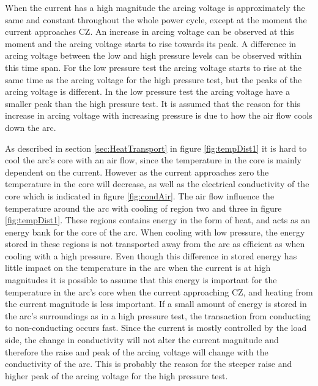 \documentclass[10pt,a4paper]{article}
\begin{document}
When the current has a high magnitude the arcing voltage is approximately the same and constant throughout the whole power cycle, except at the moment the current approaches CZ. An increase in arcing voltage can be observed at this moment and the arcing voltage starts to rise towards its peak. A difference in arcing voltage between the low and high pressure levels can be observed within this time span. For the low pressure test the arcing voltage starts to rise at the same time as the arcing voltage for the high pressure test, but the peaks of the arcing voltage is different. In the low pressure test the arcing voltage have a smaller peak than the high pressure test. It is assumed that the reason for this increase in arcing voltage with increasing pressure is due to how the air flow cools down the arc.

As described in section \ref{sec:HeatTransport} in figure \ref{fig:tempDist1} it is hard to cool the arc's core with an air flow, since the temperature in the core is mainly dependent on the current. However as the current approaches zero the temperature in the core will decrease, as well as the electrical conductivity of the core which is indicated in figure \ref{fig:condAir}. The air flow influence the temperature around the arc with cooling of region two and three in figure \ref{fig:tempDist1}. These regions contains energy in the form of heat, and acts as an energy bank for the core of the arc. When cooling with low pressure, the energy stored in these regions is not transported away from the arc as efficient as when cooling with a high pressure. Even though this difference in stored energy has little impact on the temperature in the arc when the current is at high magnitudes it is possible to assume that this energy is important for the temperature in the arc's core when the current approaching CZ, and heating from the current magnitude is less important. If a small amount of energy is stored in the arc's surroundings as in a high pressure test, the transaction from conducting to non-conducting occurs fast. Since the current is mostly controlled by the load side, the change in conductivity will not alter the current magnitude and therefore the raise and peak of the arcing voltage will change with the conductivity of the arc. This is probably the reason for the steeper raise and higher peak of the arcing voltage for the high pressure test.
\end{document}
